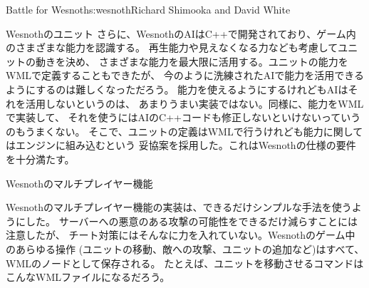 \begin{aosachapter}{Battle for Wesnoth}{s:wesnoth}{Richard Shimooka and David White}
\begin{aosasect1}{Wesnothのユニット}
さらに、WesnothのAIはC++で開発されており、ゲーム内のさまざまな能力を認識する。
再生能力や見えなくなる力なども考慮してユニットの動きを決め、
さまざまな能力を最大限に活用する。ユニットの能力をWMLで定義することもできたが、
今のように洗練されたAIで能力を活用できるようにするのは難しくなっただろう。
能力を使えるようにするけれどもAIはそれを活用しないというのは、
あまりうまい実装ではない。同様に、能力をWMLで実装して、
それを使うにはAIのC++コードも修正しないといけないっていうのもうまくない。
そこで、ユニットの定義はWMLで行うけれども能力に関してはエンジンに組み込むという
妥協案を採用した。これはWesnothの仕様の要件を十分満たす。

\end{aosasect1}

\begin{aosasect1}{Wesnothのマルチプレイヤー機能}

Wesnothのマルチプレイヤー機能の実装は、できるだけシンプルな手法を使うようにした。
サーバーへの悪意のある攻撃の可能性をできるだけ減らすことには注意したが、
チート対策にはそんなに力を入れていない。Wesnothのゲーム中のあらゆる操作
(ユニットの移動、敵への攻撃、ユニットの追加など)はすべて、WMLのノードとして保存される。
たとえば、ユニットを移動させるコマンドはこんなWMLファイルになるだろう。


\end{aosasect1}
\end{aosachapter}
